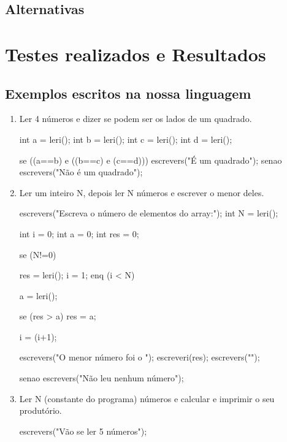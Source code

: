 \documentclass{report}
\begin{document}
\subsection{Alternativas}



\section{Testes realizados e Resultados}
\subsection{Exemplos escritos na nossa linguagem}

\begin{enumerate}
	\item Ler 4 números e dizer se podem ser os lados de um quadrado.\\
	
	\begin{code}
	int a = leri();
	int b = leri();
	int c = leri();
	int d = leri();
	
	se ((a==b) e ((b==c) e (c==d))) {
		escrevers("É um quadrado\n");
	}
	senao {
		escrevers("Não é um quadrado\n");
	}
	\end{code}	
	
	\item Ler um inteiro N, depois ler N números e escrever o menor deles.\\
	
	\begin{code}
		escrevers("Escreva o número de elementos do array:\n");
		int N = leri();
		
		int i = 0;
		int a = 0;
		int res = 0;
		
		se (N!=0){
			res = leri();
			i = 1;
			enq (i < N){
				a = leri();
				
				se (res > a){
					res = a;
				}
				
				i = (i+1);
			}
			
			
			escrevers("O menor número foi o ");
			escreveri(res);
			escrevers("\n");
			
		}
		senao{
			escrevers("Não leu nenhum número\n");
		}
	\end{code}
	
	\item Ler N (constante do programa) números e calcular e imprimir o seu produtório.\\
	
	\begin{code}
		escrevers("Vão se ler 5 números\n");
		

\end{code}
\end{enumerate}
\end{document}
